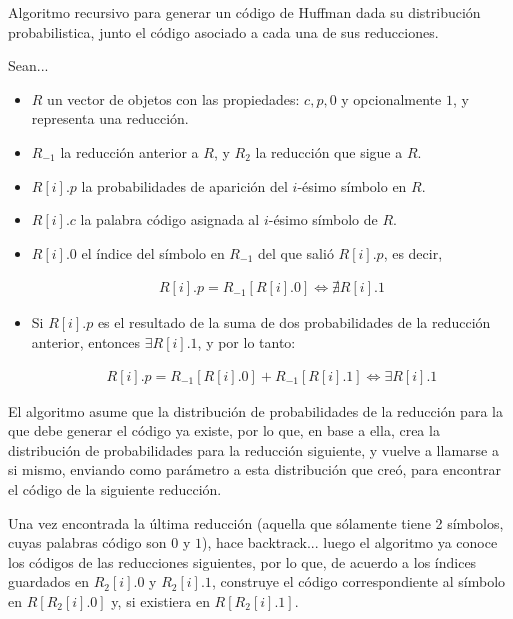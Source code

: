 \documentclass{article}
\begin{document}
Algoritmo recursivo para generar un código de Huffman dada su distribución probabilistica, junto el código asociado a cada una de sus reducciones.

Sean...

\begin{itemize}
\item $R$ un vector de objetos con las propiedades: $c, p, 0$ y opcionalmente $1$, y representa una reducción.

\item $R_{-1}$ la reducción anterior a $R$, y $R_{2}$ la reducción que sigue a $R$.

\item $R[i].p$ la probabilidades de aparición del $i$-ésimo símbolo en $R$.

\item $R[i].c$ la palabra código asignada al $i$-ésimo símbolo de $R$.

\item $R[i].0$ el índice del símbolo en $R_{-1}$ del que salió $R[i].p$, es decir,

  \begin{align*}
    R[i].p = R_{-1}[R[i].0] \iff \nexists R[i].1
  \end{align*}

\item Si $R[i].p$ es el resultado de la suma de dos probabilidades de la reducción anterior, entonces $\exists R[i].1$, y por lo tanto:

  \begin{align*}
    R[i].p = R_{-1}[R[i].0] + R_{-1}[R[i].1] \iff \exists R[i].1
  \end{align*}

\end{itemize}

El algoritmo asume que la distribución de probabilidades de la reducción para la que debe generar el código ya existe, por lo que, en base a ella, crea la distribución de probabilidades para la reducción siguiente, y vuelve a llamarse a si mismo, enviando como parámetro a esta distribución que creó, para encontrar el código de la siguiente reducción.

Una vez encontrada la última reducción (aquella que sólamente tiene 2 símbolos, cuyas palabras código son $0$ y $1$), hace backtrack... luego el algoritmo ya conoce los códigos de las reducciones siguientes, por lo que, de acuerdo a los índices guardados en $R_2[i].0$ y $R_2[i].1$, construye el código correspondiente al símbolo en $R[R_2[i].0]$ y, si existiera en $R[R_2[i].1]$.
\end{document}
